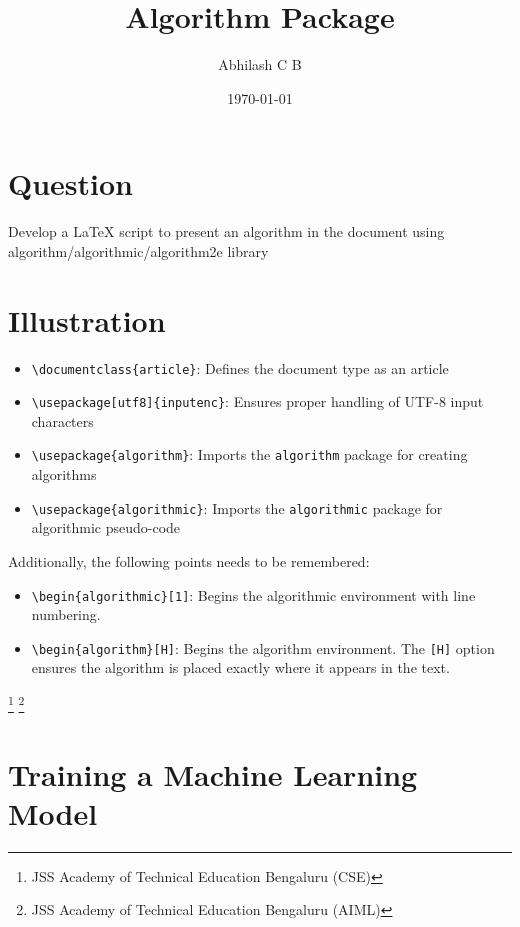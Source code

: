 \documentclass{article}
\title{Algorithm Package}
\author{Abhilash C B}
\date{\today}
\begin{document}
	\maketitle
	
	\section{Question}
	{\Large Develop a LaTeX script to present an algorithm in the document using algorithm/algorithmic/algorithm2e library}
	
	\section*{Illustration}
	\begin{itemize}
		\item \texttt{\textbackslash documentclass\{article\}}: Defines the document type as an article
		\item \texttt{\textbackslash usepackage[utf8]\{inputenc\}}: Ensures proper handling of UTF-8 input characters
		\item \texttt{\textbackslash usepackage\{algorithm\}}: Imports the \texttt{algorithm} package for creating algorithms
		\item \texttt{\textbackslash usepackage\{algorithmic\}}: Imports the \texttt{algorithmic} package for algorithmic pseudo-code
	\end{itemize}
	
	
	Additionally, the following points needs to be remembered: 
	\begin{itemize}
		\item \texttt{\textbackslash begin\{algorithmic\}[1]}: Begins the algorithmic environment with line numbering.
		\item \texttt{\textbackslash begin\{algorithm\}[H]}: Begins the algorithm environment. The \texttt{[H]} option ensures the algorithm is placed exactly where it appears in the text.
	\end{itemize}
	
	\footnote{JSS Academy of Technical Education Bengaluru (CSE)}
	\footnote{JSS Academy of Technical Education Bengaluru (AIML)}
	
	\section*{Training a Machine Learning Model}
	
\end{document}
